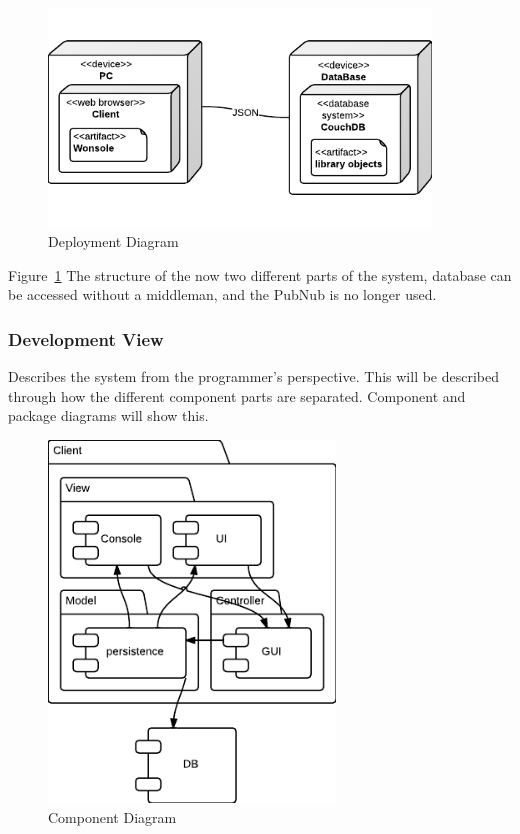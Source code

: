\begin{figure}[h]
\centering
\includegraphics[width=4in]{image/architecture/s3/s3DeploymentDiagram.png}
\caption{Deployment Diagram}
\label{figure:s3DeploymentDiagram}
\end{figure}

Figure~\ref{figure:s3DeploymentDiagram} The structure of the now two different parts of the system, database can be accessed without a middleman, and the PubNub is no longer used.

\subsubsection{Development View}
Describes the system from the programmer's perspective. This will be described through how the different component parts are separated. Component and package diagrams will show this.

\begin{figure}[h]
\centering
\includegraphics[width=3in]{image/architecture/s3/s3ComponentDiagram.png}
\caption{Component Diagram}
\label{figure:s3ComponentDiagram}
\end{figure}

